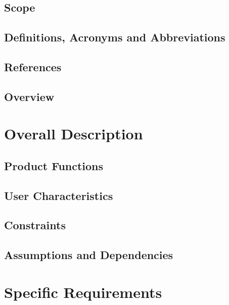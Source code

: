 \documentclass{article}
\begin{document}
	\subsection{Scope}
	

  \clearpage
	\subsection{Definitions, Acronyms and Abbreviations}
	
	
	\subsection{References}
	
	
	\subsection{Overview}
	

\clearpage
\section{Overall Description}

	\subsection{Product Functions}
	
	
	\subsection{User Characteristics}
	
	
	\subsection{Constraints}
	
	
	\subsection{Assumptions and Dependencies}
	
	
\clearpage
\section{Specific Requirements}
\end{document}
